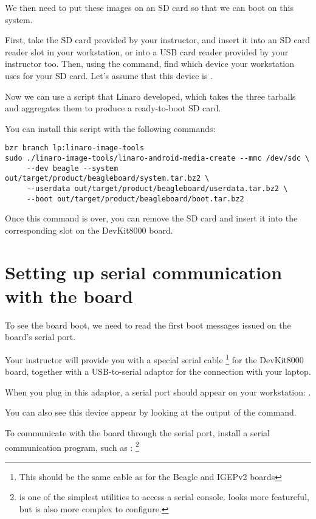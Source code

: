 We then need to put these images on an SD card so that we can boot on
this system.

First, take the SD card provided by your instructor, and insert it
into an SD card reader slot in your workstation, or into a USB card
reader provided by your instructor too. Then, using the 
command, find which device your workstation uses for your SD card.
Let's assume that this device is .

Now we can use a  script that Linaro
developed, which takes the three tarballs and aggregates them to
produce a ready-to-boot SD card.

You can install this script with the following commands:

\begin{verbatim}
bzr branch lp:linaro-image-tools
sudo ./linaro-image-tools/linaro-android-media-create --mmc /dev/sdc \
     --dev beagle --system out/target/product/beagleboard/system.tar.bz2 \
     --userdata out/target/product/beagleboard/userdata.tar.bz2 \
     --boot out/target/product/beagleboard/boot.tar.bz2
\end{verbatim}

Once this command is over, you can remove the SD card and insert it
into the corresponding slot on the DevKit8000 board.

\section{Setting up serial communication with the board}

To see the board boot, we need to read the first boot messages issued
on the board's serial port.

Your instructor will provide you with a special serial cable
\footnote{This should be the same cable as for the Beagle and IGEPv2
  boards} for the DevKit8000 board, together with a USB-to-serial
adaptor for the connection with your laptop.

When you plug in this adaptor, a serial port should appear on your
workstation: \code{/dev/ttyUSB0}.

You can also see this device appear by looking at the output of the
\code{dmesg} command.

To communicate with the board through the serial port, install a
serial communication program, such as :
\footnote{ is one of the simplest utilities to access a
  serial console. \code{minicom} looks more featureful, but is also
  more complex to configure.}

